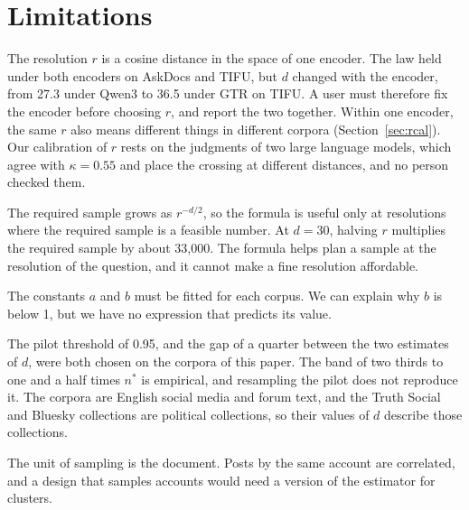 \section*{Limitations}

The resolution $r$ is a cosine distance in the space of one encoder. The law held under both encoders on AskDocs and TIFU, but $d$ changed with the encoder, from 27.3 under Qwen3 to 36.5 under GTR on TIFU. A user must therefore fix the encoder before choosing $r$, and report the two together. Within one encoder, the same $r$ also means different things in different corpora (Section~\ref{sec:rcal}). Our calibration of $r$ rests on the judgments of two large language models, which agree with $\kappa = 0.55$ and place the crossing at different distances, and no person checked them.

The required sample grows as $r^{-d/2}$, so the formula is useful only at resolutions where the required sample is a feasible number. At $d = 30$, halving $r$ multiplies the required sample by about 33{,}000. The formula helps plan a sample at the resolution of the question, and it cannot make a fine resolution affordable.

The constants $a$ and $b$ must be fitted for each corpus. We can explain why $b$ is below 1, but we have no expression that predicts its value.

The pilot threshold of 0.95, and the gap of a quarter between the two estimates of $d$, were both chosen on the corpora of this paper. The band of two thirds to one and a half times $n^{*}$ is empirical, and resampling the pilot does not reproduce it. The corpora are English social media and forum text, and the Truth Social and Bluesky collections are political collections, so their values of $d$ describe those collections.

The unit of sampling is the document. Posts by the same account are correlated, and a design that samples accounts would need a version of the estimator for clusters.
